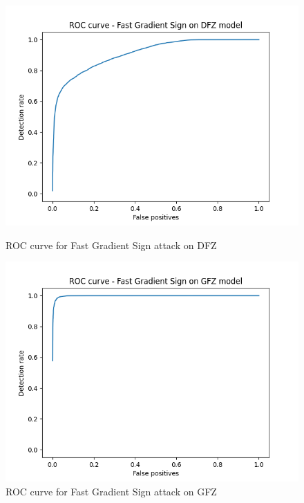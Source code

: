 \documentclass[10pt,twocolumn,letterpaper]{article}
\begin{document}
\begin{figure}[ht]
    \centering
    \begin{minipage}[b]{0.49\textwidth}
        \includegraphics[width=\textwidth]{illustrations/ROC_Fast Gradient Sign_dfz.png}
        \caption{ROC curve for Fast Gradient Sign attack on DFZ}
        \label{fig:roc_fgs_dfz}
    \end{minipage}
    \hfill
    \begin{minipage}[b]{0.49\textwidth}
        \includegraphics[width=\textwidth]{illustrations/ROC_Fast Gradient Sign_gfz.png}
        \caption{ROC curve for Fast Gradient Sign attack on GFZ}
        \label{fig:roc_fgs_gfz}
    \end{minipage}
\end{figure}
\end{document}
